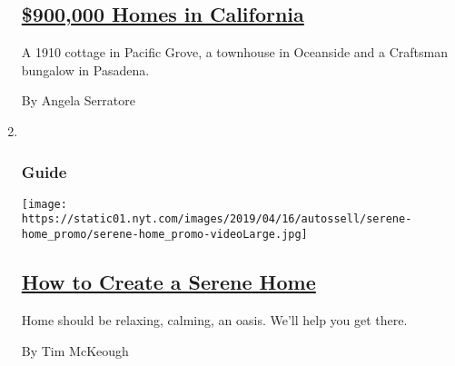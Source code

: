 \begin{enumerate}
{  \subsection{\texorpdfstring{\href{/2020/07/27/realestate/900000-dollar-homes-for-sale-in-ca.html}{\$900,000
  Homes in
  California}}{\$900,000 Homes in California}}\label{900000-homes-in-california}}

  A 1910 cottage in Pacific Grove, a townhouse in Oceanside and a
  Craftsman bungalow in Pasadena.

  By Angela Serratore
\item ~
  \hypertarget{guide}{%
  \subsubsection{Guide}\label{guide}}

  \texttt{[image: https://static01.nyt.com/images/2019/04/16/autossell/serene-home\_promo/serene-home\_promo-videoLarge.jpg]}

  \hypertarget{how-to-create-a-serene-home}{%
  \subsection{\texorpdfstring{\href{/interactive/2019/05/15/smarter-living/serene-home.html}{How
  to Create a Serene
  Home}}{How to Create a Serene Home}}\label{how-to-create-a-serene-home}}

  Home should be relaxing, calming, an oasis. We'll help you get there.

  By Tim McKeough
\end{enumerate}

